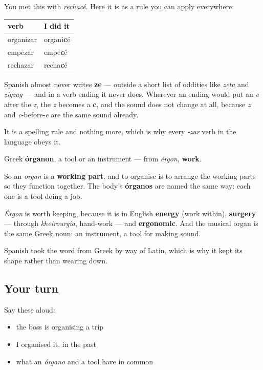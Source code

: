 \begin{grammarlens}[title={Grammar Lens: the z that becomes c}]
You met this with \emph{rechacé}. Here it is as a rule you can apply everywhere:

\noindent
\begin{tabularx}{\linewidth}{@{}>{\raggedright\arraybackslash}X>{\raggedright\arraybackslash}X@{}}
\toprule
\textbf{verb} & \textbf{I did it} \\
\midrule
organizar & organi\textbf{c}é \\
empezar & empe\textbf{c}é \\
rechazar & recha\textbf{c}é \\
\bottomrule
\end{tabularx}

Spanish almost never writes \textbf{ze} — outside a short list of oddities like \emph{zeta} and \emph{zigzag} — and in a verb ending it never does. Wherever an ending would put an \emph{e} after the \emph{z}, the \emph{z} becomes a \textbf{c}, and the sound does not change at all, because \emph{z} and \emph{c}-before-\emph{e} are the same sound already.

It is a spelling rule and nothing more, which is why every \emph{-zar} verb in the language obeys it.
\end{grammarlens}

\begin{cousinweb}
Greek \textbf{órganon}, a tool or an instrument — from \emph{érgon}, \textbf{work}.

So an \emph{organ} is a \textbf{working part}, and to organise is to arrange the working parts so they function together. The body's \textbf{órganos} are named the same way: each one is a tool doing a job.

\emph{Érgon} is worth keeping, because it is in English \textbf{energy} (work within), \textbf{surgery} — through \emph{kheirourgía}, hand-work — and \textbf{ergonomic}. And the musical organ is the same Greek noun: an instrument, a tool for making sound.

Spanish took the word from Greek by way of Latin, which is why it kept its shape rather than wearing down.
\end{cousinweb}

\subsection*{Your turn}
Say these aloud:

\begin{itemize}
\raggedright
  \item the boss is organising a trip
  \item I organised it, in the past
  \item what an \emph{órgano} and a tool have in common
\end{itemize}

